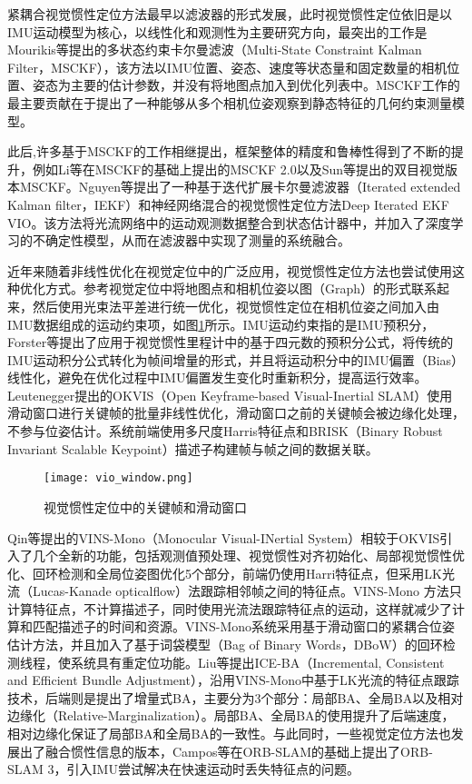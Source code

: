 紧耦合视觉惯性定位方法最早以滤波器的形式发展，此时视觉惯性定位依旧是以IMU运动模型为核心，以线性化和观测性为主要研究方向，最突出的工作是Mourikis等\cite{mourikis2007multi}提出的多状态约束卡尔曼滤波（Multi-State Constraint Kalman Filter，MSCKF），该方法以IMU位置、姿态、速度等状态量和固定数量的相机位置、姿态为主要的估计参数，并没有将地图点加入到优化列表中。MSCKF工作的最主要贡献在于提出了一种能够从多个相机位姿观察到静态特征的几何约束测量模型。

此后,许多基于MSCKF的工作相继提出，框架整体的精度和鲁棒性得到了不断的提升，例如Li等\cite{li2013high}在MSCKF的基础上提出的MSCKF 2.0以及Sun等\cite{sun2018robust}提出的双目视觉版本MSCKF。Nguyen等\cite{nguyen2024learning}提出了一种基于迭代扩展卡尔曼滤波器（Iterated extended Kalman filter，IEKF）和神经网络混合的视觉惯性定位方法Deep Iterated EKF VIO。该方法将光流网络中的运动观测数据整合到状态估计器中，并加入了深度学习的不确定性模型，从而在滤波器中实现了测量的系统融合。

近年来随着非线性优化在视觉定位中的广泛应用，视觉惯性定位方法也尝试使用这种优化方式。参考视觉定位中将地图点和相机位姿以图（Graph）的形式联系起来，然后使用光束法平差进行统一优化，视觉惯性定位在相机位姿之间加入由IMU数据组成的运动约束项，如图\ref{fig:vio_window}所示。IMU运动约束指的是IMU预积分，Forster等\cite{forster2016manifold}提出了应用于视觉惯性里程计中的基于四元数的预积分公式，将传统的IMU运动积分公式转化为帧间增量的形式，并且将运动积分中的IMU偏置（Bias）线性化，避免在优化过程中IMU偏置发生变化时重新积分，提高运行效率。Leutenegger\cite{leutenegger2022okvis2realtimescalablevisualinertial}提出的OKVIS（Open Keyframe-based Visual-Inertial SLAM）使用滑动窗口进行关键帧的批量非线性优化，滑动窗口之前的关键帧会被边缘化处理，不参与位姿估计。系统前端使用多尺度Harris\cite{harris1988combined}特征点和BRISK（Binary Robust Invariant Scalable Keypoint）\cite{leutenegger2011brisk}描述子构建帧与帧之间的数据关联。

\begin{figure}
  \centering
  \texttt{[image: vio\_window.png]}
  \caption{视觉惯性定位中的关键帧和滑动窗口}
  \label{fig:vio_window}
\end{figure}

Qin等\cite{qin2018vins}提出的VINS-Mono（Monocular Visual-INertial System）相较于OKVIS引入了几个全新的功能，包括观测值预处理、视觉惯性对齐初始化、局部视觉惯性优化、回环检测和全局位姿图优化5个部分，前端仍使用Harri特征点，但采用LK光流（Lucas-Kanade opticalflow）\cite{lucas1981iterative}法跟踪相邻帧之间的特征点。VINS-Mono 方法只计算特征点，不计算描述子，同时使用光流法跟踪特征点的运动，这样就减少了计算和匹配描述子的时间和资源。VINS-Mono系统采用基于滑动窗口的紧耦合位姿估计方法，并且加入了基于词袋模型（Bag of Binary Words，DBoW）\cite{galvez2012bags}的回环检测线程，使系统具有重定位功能。Liu等\cite{liu2018ice}提出ICE-BA（Incremental, Consistent and Efficient Bundle Adjustment），沿用VINS-Mono中基于LK光流的特征点跟踪技术，后端则是提出了增量式BA，主要分为3个部分：局部BA、全局BA以及相对边缘化（Relative-Marginalization）。局部BA、全局BA的使用提升了后端速度，相对边缘化保证了局部BA和全局BA的一致性。与此同时，一些视觉定位方法也发展出了融合惯性信息的版本，Campos等\cite{campos2021orb}在ORB-SLAM的基础上提出了ORB-SLAM 3，引入IMU尝试解决在快速运动时丢失特征点的问题。

